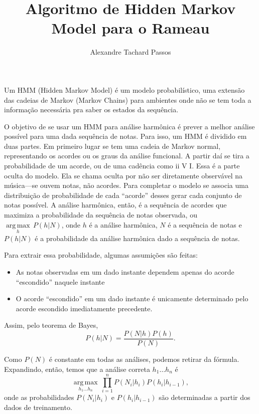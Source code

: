 \documentclass{article}
\title{Algoritmo de Hidden Markov Model para o Rameau}
\author{Alexandre Tachard Passos}
\begin{document}
\maketitle

Um HMM (Hidden Markov Model) é um modelo probabilístico, uma       
extensão das cadeias de Markov (Markov Chains) para ambientes onde 
não se tem toda a informação necessária pra saber os estados da    
sequência.                                                         
                                                                   
O objetivo de se usar um HMM para análise harmônica é prever a melhor
análise possível para uma dada sequência de notas. Para isso, um HMM é
dividido em duas partes. Em primeiro lugar se tem uma cadeia de Markov
normal, representando os acordes ou os graus da análise funcional. A
partir daí se tira a probabilidade de um acorde, ou de uma cadência
como ii V I. Essa é a parte oculta do modelo. Ela se chama oculta por
não ser diretamente observável na música---se ouvem notas, não
acordes. Para completar o modelo se associa uma distribuição de
probabilidade de cada ``acorde'' desses gerar cada conjunto de notas
possível. A análise harmônica, então, é a sequência de acordes que
maximiza a probabilidade da sequência de notas observada, ou $
\underset{h}{\operatorname{arg\,max}} \, P(h|N) $, onde $h$ é a análise
harmônica, $N$ é a sequência de notas e $P(h|N)$ é a probabilidade da
análise harmônica dado a sequência de notas.
                                                                   
Para extrair essa probabilidade, algumas assumições são feitas:    
\begin{itemize}                                                    
 \item As notas observadas em um dado instante dependem apenas do  
   acorde ``escondido'' naquele instante                           
 \item O acorde ``escondido'' em um dado instante é unicamente     
   determinado pelo acorde escondido imediatamente precedente.     
\end{itemize}                                                      
                                                                   
Assim, pelo teorema de Bayes,
\[P(h|N) = \frac{P(N|h)P(h)}{P(N)}.\]

Como $P(N)$ é constante em todas as análises, podemos retirar da
fórmula. Expandindo, então, temos que a análise correta $h_1 \ldots
h_n$ é
\[\underset{h_1 \ldots h_n}{\operatorname{arg\,max}} \, \prod_{i=1}^n P(N_i|h_i)P(h_i|h_{i-1}),\]
onde as probabilidades $P(N_i|h_i)$ e $P(h_i|h_{i-1})$ são
determinadas a partir dos dados de treinamento.
\end{document}
